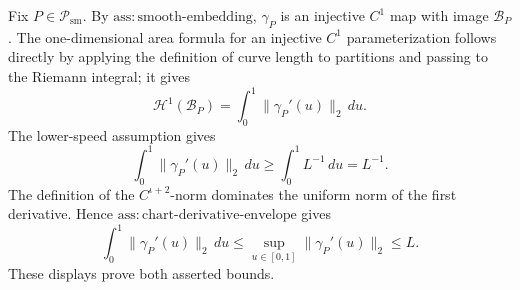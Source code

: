 Fix \(P\in\mathcal P_{\mathrm{sm}}\).  By \(\mathrm{ass:smooth\text{-}embedding}\), \(\gamma_P\) is an injective \(C^1\) map with image \(\mathcal B_P\).  The one-dimensional area formula for an injective \(C^1\) parameterization follows directly by applying the definition of curve length to partitions and passing to the Riemann integral; it gives
\[
 \mathcal H^1(\mathcal B_P)=\int_0^1\lVert\gamma_P'(u)\rVert_2\,du.
\]
The lower-speed assumption gives
\[
 \int_0^1\lVert\gamma_P'(u)\rVert_2\,du\geq\int_0^1L^{-1}\,du=L^{-1}.
\]
The definition of the \(C^{\iota+2}\)-norm dominates the uniform norm of the first derivative.  Hence \(\mathrm{ass:chart\text{-}derivative\text{-}envelope}\) gives
\[
 \int_0^1\lVert\gamma_P'(u)\rVert_2\,du
 \leq\sup_{u\in[0,1]}\lVert\gamma_P'(u)\rVert_2\leq L.
\]
These displays prove both asserted bounds.